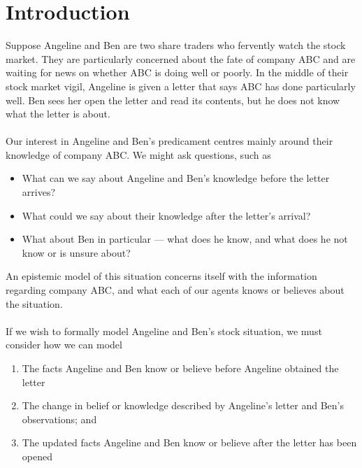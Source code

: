 \chapter{Introduction} \label{chapter:intro}

Suppose Angeline and Ben are two share traders who fervently watch the stock market. They
are particularly concerned about the fate of company ABC and are waiting for news on whether ABC is
doing well or poorly. In the middle of their stock market vigil, Angeline is given a letter that says
ABC has done particularly well. Ben sees her open the letter and read its contents, but he does not
know what the letter is about.\\
\\
Our interest in Angeline and Ben's predicament centres mainly around their knowledge of company ABC.
We might ask questions, such as
\begin{itemize}
	\item What can we say about Angeline and Ben's knowledge before the letter arrives?
	\item What could we say about their knowledge after the letter's arrival?
	\item What about Ben in particular --- what does he know, and what does he not know or is unsure about?
\end{itemize}
An epistemic model of this situation concerns itself with the information regarding company ABC, and
what each of our agents knows or believes about the situation.\\
\\
If we wish to formally model Angeline and Ben's stock situation, we must consider how we can model
\begin{enumerate}
	\item The facts Angeline and Ben know or believe before Angeline obtained the letter
	\item The change in belief or knowledge described by Angeline's letter and Ben's observations; and
	\item The updated facts Angeline and Ben know or believe after the letter has been opened
\end{enumerate}

